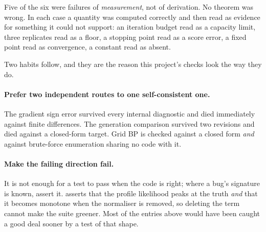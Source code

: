 Five of the six were failures of \emph{measurement}, not of derivation. No theorem was wrong. In
each case a quantity was computed correctly and then read as evidence for something it could not
support: an iteration budget read as a capacity limit, three replicates read as a floor, a
stopping point read as a score error, a fixed point read as convergence, a constant read as
absent.

Two habits follow, and they are the reason this project's checks look the way they do.

\paragraph{Prefer two independent routes to one self-consistent one.} The gradient sign error
survived every internal diagnostic and died immediately against finite differences. The
generation comparison survived two revisions and died against a closed-form target. Grid BP is
checked against a closed form \emph{and} against brute-force enumeration sharing no code with it.

\paragraph{Make the failing direction fail.} It is not enough for a test to pass when the code is
right; where a bug's signature is known, assert it.  asserts that
the profile likelihood peaks at the truth \emph{and} that it becomes monotone when the normaliser
is removed, so deleting the term cannot make the suite greener. Most of the entries above would
have been caught a good deal sooner by a test of that shape.
